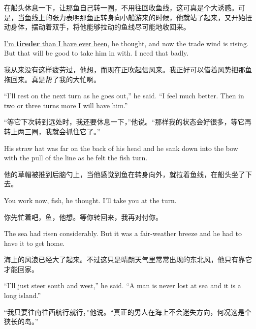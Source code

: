 \begin{paracol}{2}
在船头休息一下，让那鱼自己转一圈，不用往回收鱼线，这可真是个大诱惑。可是，当鱼线上的张力表明那鱼正转身向小船游来的时候，他就站了起来，又开始扭动身体，摆动着双手，将他能够拉动的鱼线尽可能地收回来。

\switchcolumn*

\uline{I'm \textbf{tireder} than I have ever been}, he thought, and now the trade wind is
rising. But that will be good to take him in with. I need that badly.

\switchcolumn

我从来没有这样疲劳过，他想，而现在正吹起信风来。我正好可以借着风势把那鱼拖回来。真是帮了我的大忙啊。

\switchcolumn*

``I'll rest on the next turn as he goes out,'' he said. ``I feel much
better. Then in two or three turns more I will have him.''

\switchcolumn

“等它下次转到远处时，我还要休息一下，”他说。“那样我的状态会好很多，等它再转上两三圈，我就会抓住它了。”

\switchcolumn*

His straw hat was far on the back of his head and he sank down into the bow
with the pull of the line as he felt the fish turn.

\switchcolumn

他的草帽被推到后脑勺上，当他感觉到鱼在转身向外，就拉着鱼线，在船头坐了下去。

\switchcolumn*

You work now, fish, he thought. I'll take you at the turn.

\switchcolumn

你先忙着吧，鱼，他想。等你转回来，我再对付你。

\switchcolumn*

The sea had risen \gls{considerably}. But it was a \gls{fair-weather} breeze and
he had to have it to get home.

\switchcolumn

海上的风浪已经大了起来。不过这只是晴朗天气里常常出现的东北风，他只有靠它才能回家。

\switchcolumn*

``I'll just \gls{steer} south and west,'' he said. ``A man is never lost at sea
and it is a long island.''

\switchcolumn

“我只要往南往西航行就行，”他说。“真正的男人在海上不会迷失方向，何况这是个狭长的岛。”

\switchcolumn*


\end{paracol}
